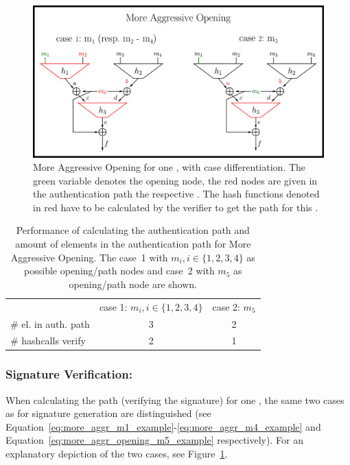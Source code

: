 \begin{figure}
\centering
\includegraphics[]{images/Methods/more_aggr_opening.png}
\caption{More Aggressive Opening for one \tfblock, with case differentiation. The green variable denotes the opening node, the red nodes are given in the authentication path the respective \tfblock. The hash functions denoted in red have to be calculated by the verifier to get the path for this \tfblock.}
\label{img:t5_more_aggr_opening}
\end{figure}

\begin{table}
\centering
\begin{tabular}{l c c} 
 \hline\noalign{\smallskip}
 \multicolumn{3}{c}{\textbf{More Aggressive Opening}} \\
 \hline\noalign{\smallskip}
 & case 1: $m_i, i \in \{1,2,3,4\}$ & case 2: $m_5$ \\
 \# el. in auth. path & 3 & 2 \\
 \# hashcalls verify & 2 & 1 \\
 \hline
\end{tabular}
\caption{Performance of calculating the authentication path and amount of elements in the authentication path for More Aggressive Opening. The case~1 with $m_i, i \in \{1,2,3,4\}$ as possible opening/path nodes and case~2 with $m_5$ as opening/path node are shown.}
\label{table:more_aggr_opening}
\end{table}

\subsubsection{Signature Verification: \texorpdfstring{\tfblock}{T5-Block}}
When calculating the path (verifying the signature) for one \tfblock, the same two cases as for signature generation are distinguished (see Equation~\ref{eq:more_aggr_m1_example}-\ref{eq:more_aggr_m4_example} and Equation~\ref{eq:more_aggr_opening_m5_example} respectively). For an explanatory depiction of the two cases, see Figure~\ref{img:t5_more_aggr_opening}.

